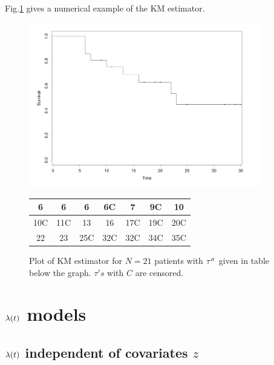 Fig.\ref{fig-kn-graph} gives a numerical
example of the
 KM estimator.

 \begin{figure}[h!]
\centering
\includegraphics[width=4in]
{survival/km-graph.png}
\begin{tabular}{|c|c|c|c|c|c|c|}
\hline\hline
6& 6& 6& 6C& 7& 9C& 10\\
\hline
10C&11C& 13& 16& 17C& 19C& 20C\\
\hline
 22& 23& 25C& 32C& 32C& 34C& 35C\\
 \hline
 \end{tabular}
\caption{Plot of KM estimator for
$N=21$ patients
with $\tau^\sigma$ given in table
below the graph.
$\tau's$ with $C$
 are censored.}
\label{fig-kn-graph}
\end{figure}





\section{$\lambda(t)$ models}

\subsection{$\lambda(t)$  independent
of covariates $z$}

